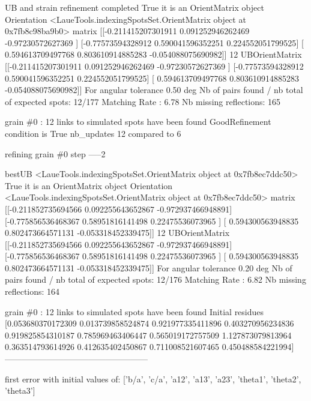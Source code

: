 \documentclass[letterpaper,10pt,english]{sphinxmanual}
\begin{document}
\begin{sphinxalltt}
UB and strain refinement completed
True it is an OrientMatrix object
Orientation \textless{}LaueTools.indexingSpotsSet.OrientMatrix object at 0x7fb8c98ba9b0\textgreater{}
matrix {[}{[}-0.211415207301911  0.091252946262469 -0.97230572627369 {]}
 {[}-0.77573594328912   0.590041596352251  0.224552051799525{]}
 {[} 0.594613709497768  0.803610914885283 -0.054088075690982{]}{]}
 12
UBOrientMatrix {[}{[}-0.211415207301911  0.091252946262469 -0.97230572627369 {]}
 {[}-0.77573594328912   0.590041596352251  0.224552051799525{]}
 {[} 0.594613709497768  0.803610914885283 -0.054088075690982{]}{]}
For angular tolerance 0.50 deg
Nb of pairs found / nb total of expected spots: 12/177
Matching Rate : 6.78
Nb missing reflections: 165

grain \#0 : 12 links to simulated spots have been found
GoodRefinement condition is  True
nb\_updates 12 compared to 6


 refining grain \#0 step -----2

bestUB \textless{}LaueTools.indexingSpotsSet.OrientMatrix object at 0x7fb8ec7ddc50\textgreater{}
True it is an OrientMatrix object
Orientation \textless{}LaueTools.indexingSpotsSet.OrientMatrix object at 0x7fb8ec7ddc50\textgreater{}
matrix {[}{[}-0.211852735694566  0.092255643652867 -0.972937466948891{]}
 {[}-0.775856536468367  0.58951816141498   0.22475536073965 {]}
 {[} 0.594300563948835  0.802473664571131 -0.053318452339475{]}{]}
 12
UBOrientMatrix {[}{[}-0.211852735694566  0.092255643652867 -0.972937466948891{]}
 {[}-0.775856536468367  0.58951816141498   0.22475536073965 {]}
 {[} 0.594300563948835  0.802473664571131 -0.053318452339475{]}{]}
For angular tolerance 0.20 deg
Nb of pairs found / nb total of expected spots: 12/176
Matching Rate : 6.82
Nb missing reflections: 164

grain \#0 : 12 links to simulated spots have been found
Initial residues {[}0.053680370172309 0.013739858524874 0.921977335411896 0.403270956234836
 0.919825854310187 0.785969463406447 0.565019172757509 1.127873079813964
 0.363514793614926 0.412635402450867 0.711008521607465 0.450488584221994{]}
---------------------------------------------------



\sphinxstylestrong{***********************}
first error with initial values of: {[}'b/a', 'c/a', 'a12', 'a13', 'a23', 'theta1', 'theta2', 'theta3'{]}


\end{sphinxalltt}
\end{document}
